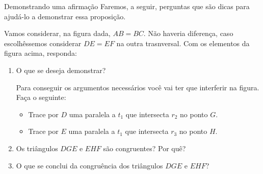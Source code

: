 \begin{task}{Demonstrando uma afirmação}
Faremos, a seguir, perguntas que são dicas para ajudá-lo a demonstrar essa proposição.

Vamos considerar, na figura dada, \(AB=BC\). Não haveria diferença, caso escolhêssemos considerar \(DE=EF\) na outra trasnversal. Com os elementos da figura acima, responda:
\begin{enumerate}
\item {} 
O que se deseja demonstrar?

Para conseguir os argumentos necessários você vai ter que interferir na figura. Faça o seguinte:
\begin{itemize}
\item {} 
Trace por \(D\) uma paralela a \(t_1\) que intersecta \(r_2\) no ponto \(G\).

\item {} 
Trace por \(E\) uma paralela a \(t_1\) que intersecta \(r_3\) no ponto \(H\).

\end{itemize}

\item {} 
Os triângulos \(DGE\) e \(EHF\) são congruentes? Por quê?

\item {} 
O que se conclui da congruência dos triângulos \(DGE\) e \(EHF\)?

\end{enumerate}
\end{task}




\practice{}

